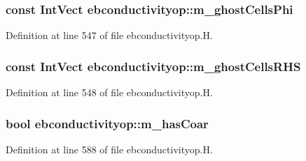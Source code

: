 \subsubsection[{\texorpdfstring{m\+\_\+ghost\+Cells\+Phi}{m_ghostCellsPhi}}]{\setlength{\rightskip}{0pt plus 5cm}const Int\+Vect ebconductivityop\+::m\+\_\+ghost\+Cells\+Phi\hspace{0.3cm}{\ttfamily [protected]}}\hypertarget{classebconductivityop_af5d27323ec83f4afc0173a52d0e43a1f}{}\label{classebconductivityop_af5d27323ec83f4afc0173a52d0e43a1f}


Definition at line 547 of file ebconductivityop.\+H.

\subsubsection[{\texorpdfstring{m\+\_\+ghost\+Cells\+R\+HS}{m_ghostCellsRHS}}]{\setlength{\rightskip}{0pt plus 5cm}const Int\+Vect ebconductivityop\+::m\+\_\+ghost\+Cells\+R\+HS\hspace{0.3cm}{\ttfamily [protected]}}\hypertarget{classebconductivityop_acebaa37fd03afe5ba08c8ebd1e0bc48a}{}\label{classebconductivityop_acebaa37fd03afe5ba08c8ebd1e0bc48a}


Definition at line 548 of file ebconductivityop.\+H.

\subsubsection[{\texorpdfstring{m\+\_\+has\+Coar}{m_hasCoar}}]{\setlength{\rightskip}{0pt plus 5cm}bool ebconductivityop\+::m\+\_\+has\+Coar\hspace{0.3cm}{\ttfamily [protected]}}\hypertarget{classebconductivityop_add00374585314f0ec1aca1b873835b82}{}\label{classebconductivityop_add00374585314f0ec1aca1b873835b82}


Definition at line 588 of file ebconductivityop.\+H.

